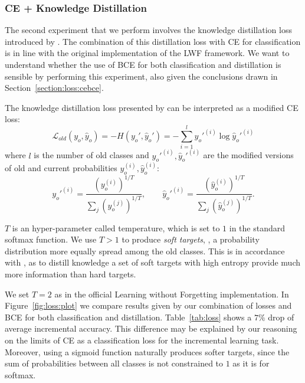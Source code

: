 \documentclass[10pt,twocolumn,letterpaper]{article}
\begin{document}
\subsubsection{CE + Knowledge Distillation}
The second experiment that we perform involves the knowledge distillation loss introduced by \cite{hinton:2015}. The combination of this distillation loss with CE for classification is in line with the original implementation of the LWF framework. We want to understand whether the use of BCE for both classification and distillation is sensible by performing this experiment, also given the conclusions drawn in Section~\ref{section:loss:cebce}.

The knowledge distillation loss presented by \cite{hinton:2015} can be interpreted as a modified CE loss:
\begin{equation}
    \mathcal{L}_{old}(y_{o}, \hat{y}_{o})=-H(y_{o}', \hat{y}_{o}')=-\sum_{i=1}^{l} y_{o}'^{(i)} \log{\hat{y}_{o}'^{(i)}} \label{eq:loss:cebce}
\end{equation}
where $l$ is the number of old classes and $y_{o}'^{(i)}, \hat{y}_{o}'^{(i)}$ are the modified versions of old and current probabilities $y_{o}^{(i)}, \hat{y}_{o}^{(i)}$:
\begin{equation}
    y_{o}'^{(i)}=\frac{(y_{o}^{(i)})^{1/T}}{\sum_{j} (y_{o}^{(j)})^{1/T}}, \qquad \hat{y}_{o}'^{(i)}=\frac{(\hat{y}_{o}^{(i)})^{1/T}}{\sum_{j} (\hat{y}_{o}^{(j)})^{1/T}}. \label{eq:loss:cebce2}
\end{equation}

$T$ is an hyper-parameter called temperature, which is set to $1$ in the standard softmax function. We use $T > 1$ to produce \emph{soft targets}, \ie, a probability distribution more equally spread among the old classes. This is in accordance with \cite{hinton:2015}, as to distill knowledge a set of soft targets with high entropy provide much more information than hard targets.

We set $T = 2$ as in the official Learning without Forgetting implementation. In Figure~\ref{fig:loss:plot} we compare results given by our combination of losses and BCE for both classification and distillation. Table~\ref{tab:loss} shows a $7\%$ drop of average incremental accuracy. This difference may be explained by our reasoning on the limits of CE as a classification loss for the incremental learning task. Moreover, using a sigmoid function naturally produces softer targets, since the sum of probabilities between all classes is not constrained to $1$ as it is for softmax.
\end{document}
